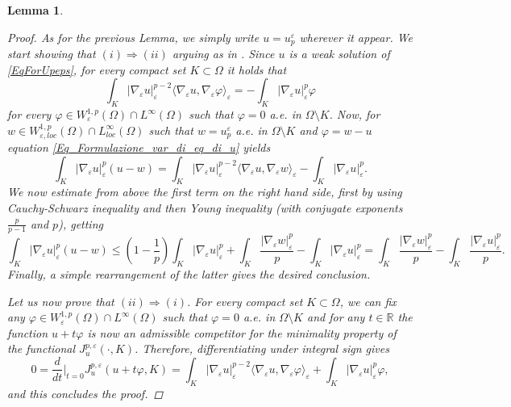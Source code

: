 \documentclass[10pt]{amsart}
\numberwithin{equation}{section}
\newtheorem{lemma}[theorem]{Lemma}
\theoremstyle{definition}
\begin{document}
\begin{lemma}
\begin{itemize}
\end{itemize}
\begin{proof}
As for the previous Lemma, we simply write $u=u^\varepsilon_p$ wherever it appear.
We start showing that $(i) \Rightarrow (ii)$ arguing as in \cite{Moser,CuiZhao}. 
Since $u$ is a weak solution of \eqref{EqForUpeps}, for every compact set $K \subset \Omega$ it holds that
\begin{equation}\label{Eq_Formulazione_var_di_eq_di_u}
\int_{K}|\nabla_\varepsilon u|_\varepsilon^{p-2}\langle\nabla_\varepsilon u, \nabla_\varepsilon \varphi \rangle_\varepsilon = - \int_{K}|\nabla_\varepsilon u|_\varepsilon^{p}\varphi 
\end{equation}
\noindent for every $\varphi \in W^{1,p}_\varepsilon(\Omega)\cap L^\infty(\Omega)$ such that $\varphi=0$ a.e. in $\Omega \setminus K$.
Now, for $w\in W^{1,p}_{\varepsilon,loc}(\Omega)  \cap L^\infty_{loc}(\Omega) $ such that $w= u_{p}^{\varepsilon}$ a.e. in $\Omega \setminus K$ and $\varphi = w-u$ equation \eqref{Eq_Formulazione_var_di_eq_di_u} yields
\begin{equation*}
\int_{K}|\nabla_\varepsilon u|_\varepsilon^{p}(u-w) = \int_{K}|\nabla_\varepsilon u|_\varepsilon^{p-2}\langle \nabla_\varepsilon u, \nabla_\varepsilon w\rangle_\varepsilon - \int_{K}|\nabla_\varepsilon u|_\varepsilon^{p}.
\end{equation*}
We now estimate from above the first term on the right hand side, first by using Cauchy-Schwarz inequality and then Young inequality (with conjugate exponents $\tfrac{p}{p-1}$ and $p$), getting
\begin{equation}
\int_{K}|\nabla_\varepsilon u|_\varepsilon^{p}(u-w) \leq \left(1-\frac1p\right) \int_{K}|\nabla_\varepsilon u|_\varepsilon^{p} +\int_{K}\dfrac{|\nabla_\varepsilon w|_\varepsilon^{p}}{p} - \int_{K}|\nabla_\varepsilon u|_\varepsilon^{p} = \int_{K}\dfrac{|\nabla_\varepsilon w|_\varepsilon^{p}}{p} - \int_{K}\dfrac{|\nabla_\varepsilon u|_\varepsilon^{p}}{p}. 
\end{equation}
Finally, a simple rearrangement of the latter gives the desired conclusion.

Let us now prove that $(ii)\Rightarrow (i)$. For every compact set $K \subset \Omega$, we can fix any $\varphi \in W^{1,p}_\varepsilon(\Omega)\cap L^\infty(\Omega)$ such that $\varphi=0$ a.e. in $\Omega \setminus K$ and for any $t \in \mathbb{R}$ the function $u+t\varphi$ is now an admissible competitor for the minimality property of the functional $J^{p,\varepsilon}_{u}(\cdot,K)$. Therefore, differentiating under integral sign gives
\begin{equation*}
0 = \dfrac{d}{dt}\Big|_{t=0}J^{p,\varepsilon}_u(u+t\varphi,K) = \int_{K}|\nabla_\varepsilon u|_\varepsilon^{p-2}\langle \nabla_\varepsilon u, \nabla_\varepsilon \varphi\rangle_\varepsilon +\int_{K}|\nabla_\varepsilon u|_\varepsilon^{p}\varphi,
\end{equation*}
\noindent and this concludes the proof.
\end{proof}
\end{lemma}
\end{document}
